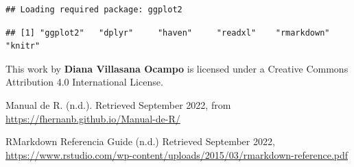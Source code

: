 \documentclass[
]{book}
\begin{document}
\begin{verbatim}
## Loading required package: ggplot2
\end{verbatim}

\begin{verbatim}
## [1] "ggplot2"   "dplyr"     "haven"     "readxl"    "rmarkdown" "knitr"
\end{verbatim}

This work by { \textbf{Diana Villasana Ocampo}} is licensed under a Creative Commons Attribution 4.0 International License.

Manual de R. (n.d.). Retrieved September 2022, from \url{https://fhernanb.github.io/Manual-de-R/}

RMarkdown Referencia Guide (n.d.) Retrieved September 2022, \url{https://www.rstudio.com/wp-content/uploads/2015/03/rmarkdown-reference.pdf}

  
\end{document}
